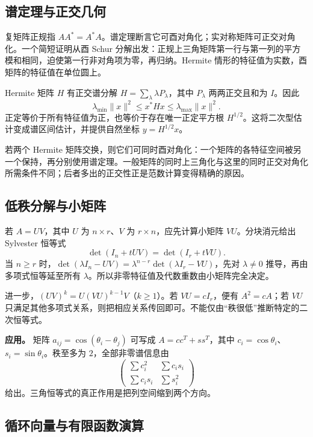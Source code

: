 \documentclass[12pt,fontset=fandol]{ctexart}
\begin{document}
\subsection{谱定理与正交几何}

\label{app:linear-spectral}

复矩阵正规指 $AA^*=A^*A$。谱定理断言它可酉对角化；实对称矩阵可正交对角化。一个简短证明从酉 Schur 分解出发：正规上三角矩阵第一行与第一列的平方模和相同，迫使第一行非对角项为零，再归纳。Hermite 情形的特征值为实数，酉矩阵的特征值在单位圆上。

Hermite 矩阵 $H$ 有正交谱分解 $H=\sum_\lambda\lambda P_\lambda$，其中 $P_\lambda$ 两两正交且和为 $I$。因此
\[
\lambda_{\min}\|x\|^2\leq x^*Hx\leq\lambda_{\max}\|x\|^2.
\]
正定等价于所有特征值为正，也等价于存在唯一正定平方根 $H^{1/2}$。这将二次型估计变成谱区间估计，并提供自然坐标 $y=H^{1/2}x$。

若两个 Hermite 矩阵交换，则它们可同时酉对角化：一个矩阵的各特征空间被另一个保持，再分别使用谱定理。一般矩阵的同时上三角化与这里的同时正交对角化所需条件不同；后者多出的正交性正是范数计算变得精确的原因。

\subsection{低秩分解与小矩阵}

\label{app:linear-lowrank}

若 $A=UV$，其中 $U$ 为 $n\times r$、$V$ 为 $r\times n$，应先计算小矩阵 $VU$。分块消元给出 Sylvester 恒等式
\[
\det(I_n+tUV)=\det(I_r+tVU).
\]
当 $n\geq r$ 时，$\det(\lambda I_n-UV)=\lambda^{n-r}\det(\lambda I_r-VU)$，先对 $\lambda\neq0$ 推导，再由多项式恒等延至所有 $\lambda$。所以非零特征值及代数重数由小矩阵完全决定。

进一步，$(UV)^k=U(VU)^{k-1}V$（$k\geq1$）。若 $VU=cI_r$，便有 $A^2=cA$；若 $VU$ 只满足其他多项式关系，则把相应关系传回即可。不能仅由“秩很低”推断特定的二次恒等式。

\textbf{应用。} 矩阵 $a_{ij}=\cos(\theta_i-\theta_j)$ 可写成 $A=cc^T+ss^T$，其中 $c_i=\cos\theta_i$、$s_i=\sin\theta_i$。秩至多为 $2$，全部非零谱信息由
\[
\begin{pmatrix}\sum c_i^2&\sum c_is_i\\\sum c_is_i&\sum s_i^2\end{pmatrix}
\]
给出。三角恒等式的真正作用是把列空间缩到两个方向。

\subsection{循环向量与有限函数演算}
\end{document}
